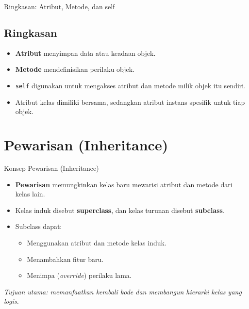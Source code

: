 \documentclass[aspectratio=169, table]{beamer}
\begin{document}
\begin{frame}[fragile]{Ringkasan: Atribut, Metode, dan self}
\vspace{10pt}
\begin{center}
\end{center}

\subsection*{Ringkasan}
\begin{itemize}
    \item \textbf{Atribut} menyimpan data atau keadaan objek.
    \item \textbf{Metode} mendefinisikan perilaku objek.
    \item \texttt{self} digunakan untuk mengakses atribut dan metode milik objek itu sendiri.
    \item Atribut kelas dimiliki bersama, sedangkan atribut instans spesifik untuk tiap objek.
\end{itemize}
\end{frame}

\section{Pewarisan (Inheritance)}

\begin{frame}[fragile]{Konsep Pewarisan (Inheritance)}
\vspace{20pt}
\begin{itemize}
    \item \textbf{Pewarisan} memungkinkan kelas baru mewarisi atribut dan metode dari kelas lain.
    \item Kelas induk disebut \textbf{superclass}, dan kelas turunan disebut \textbf{subclass}.
    \item Subclass dapat:
    \begin{itemize}
        \item Menggunakan atribut dan metode kelas induk.
        \item Menambahkan fitur baru.
        \item Menimpa (\emph{override}) perilaku lama.
    \end{itemize}
\end{itemize}
\begin{center}
\textit{Tujuan utama: memanfaatkan kembali kode dan membangun hierarki kelas yang logis.}
\end{center}
\end{frame}
\end{document}
